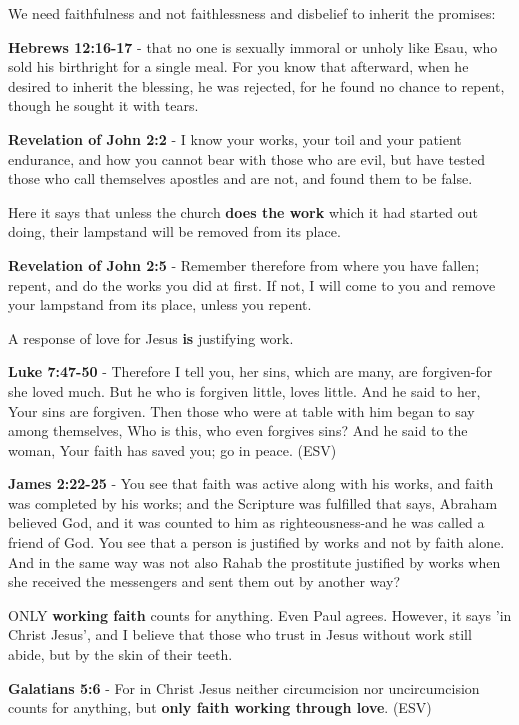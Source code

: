 \documentclass[11pt]{article}
\begin{document}
We need faithfulness and not faithlessness and disbelief to inherit the promises:

\textbf{Hebrews 12:16-17} - that no one is sexually immoral or unholy like Esau, who sold his birthright for a single meal. For you know that afterward, when he desired to inherit the blessing, he was rejected, for he found no chance to repent, though he sought it with tears.

\textbf{Revelation of John 2:2} - I know your works, your toil and your patient endurance, and how you cannot bear with those who are evil, but have tested those who call themselves apostles and are not, and found them to be false.

Here it says that unless the church \textbf{does the work} which it had started out doing, their lampstand will be removed from its place.

\textbf{Revelation of John 2:5} - Remember therefore from where you have fallen; repent, and do the works you did at first. If not, I will come to you and remove your lampstand from its place, unless you repent.

A response of love for Jesus \textbf{is} justifying work.

\textbf{Luke 7:47-50} - Therefore I tell you, her sins, which are many, are forgiven-for she loved much. But he who is forgiven little, loves little. And he said to her, Your sins are forgiven. Then those who were at table with him began to say among themselves, Who is this, who even forgives sins? And he said to the woman, Your faith has saved you; go in peace. (ESV)

\textbf{James 2:22-25} - You see that faith was active along with his works, and faith was completed by his works; and the Scripture was fulfilled that says, Abraham believed God, and it was counted to him as righteousness-and he was called a friend of God. You see that a person is justified by works and not by faith alone. And in the same way was not also Rahab the prostitute justified by works when she received the messengers and sent them out by another way?

ONLY \textbf{working faith} counts for anything. Even Paul agrees. However, it says 'in Christ Jesus', and I believe that those who trust in Jesus without work still abide, but by the skin of their teeth.

\textbf{Galatians 5:6} - For in Christ Jesus neither circumcision nor uncircumcision counts for anything, but \textbf{only faith working through love}. (ESV)
\end{document}
